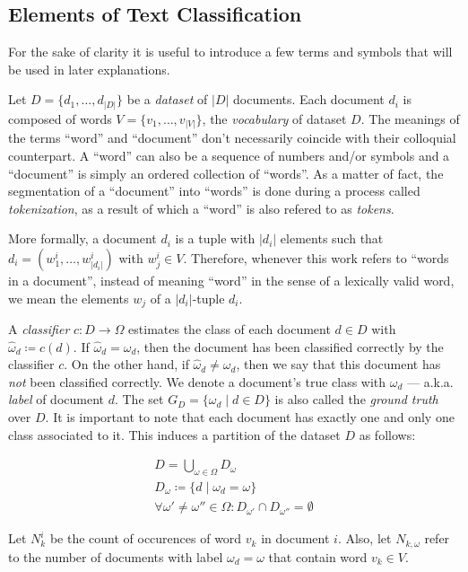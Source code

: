  \subsection{Elements of Text Classification}
 
For the sake of clarity it is useful to introduce a few terms and symbols that
will be used in later explanations.

Let $D=\{d_1, \ldots, d_{|D|}\}$ be a \textit{dataset} of $|D|$
documents. Each document $d_i$ is composed of words $V = \{v_1, \ldots,
v_{|V|}\}$, the \textit{vocabulary} of dataset $D$.
The meanings of the terms ``word'' and ``document'' don't necessarily coincide
with their colloquial counterpart. A ``word'' can also be a sequence of numbers
and/or symbols and a ``document'' is simply an ordered collection of ``words''.
As a matter of fact, the segmentation of a ``document'' into ``words'' is done
during a process called \emph{tokenization}, as a result of which a
``word'' is also refered to as \emph{tokens}.

More formally, a document $d_i$ is a tuple with $|d_i|$ elements such that
$d_i = (w_1^i,\ldots,w_{|d_i|}^i)$ with $w_j^i \in V$.
Therefore, whenever this work refers to ``words in a document'', instead of
meaning ``word'' in the sense of a lexically valid word, we mean the elements
$w_j$ of a $|d_i|$-tuple $d_i$.

A \emph{classifier} $c: D \to \Omega$ estimates the class of each 
document $d \in D$ with $\hat{\omega}_{d} \coloneqq c(d)$. If $\hat{\omega}_{d} =
\omega_{d}$, then the document has been classified correctly by the classifier $c$. 
On the other hand, if $\hat{\omega}_{d} \neq \omega_{d}$, then we say that
this document has \emph{not }been classified correctly. We denote a document's
true class with $\omega_{d}$ ---  a.k.a. \emph{label} of document $d$. The set
$G_D = \{\omega_d \mid d \in D\}$ is also called the \emph{ground truth} over $D$. It
is important to note that each document has exactly one and only one class
associated to it. This induces a partition of the dataset $D$ as follows:

\begin{eqnarray*}
 D = \bigcup\limits_{\omega \in \Omega} D_\omega \\
 D_\omega \coloneqq  \{ d \mid \omega_d = \omega\} \\
\forall \omega' \neq \omega'' \in \Omega: D_{\omega'} \cap D_{\omega''} =
 \emptyset 
\end{eqnarray*}
 
Let $N_k^i$ be the count of occurences of word $v_k$ in document $i$. Also, let
$N_{k,\omega}$ refer to the number of documents with label $\omega_d = \omega$ 
that contain word $v_k \in V$.

